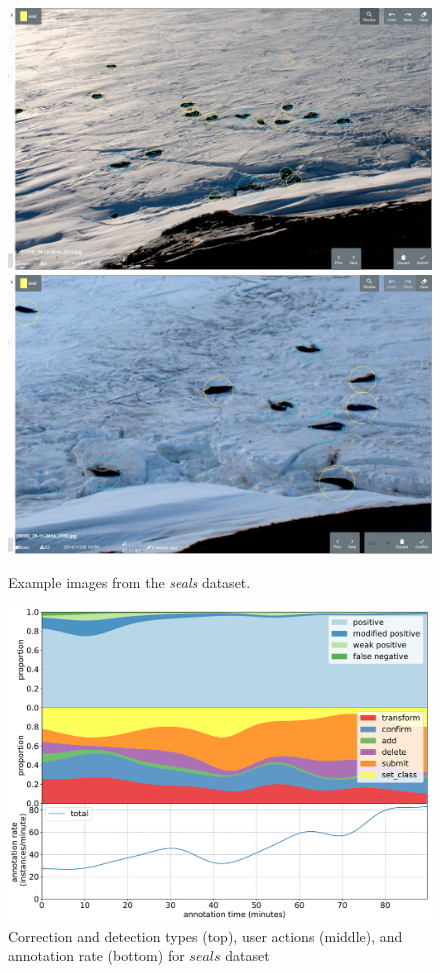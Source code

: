 \begin{figure}[!h]
\centering
  \includegraphics[width=0.475\linewidth]{figures/annotation/screenshots/seals_small2.png}
  \hfill
  \includegraphics[width=0.45\linewidth]{figures/annotation/screenshots/seals_big.png}
  \caption{}
\caption{ Example images from the \emph{seals} dataset.}
\label {fig:seals_examples}
\end{figure}

\begin{figure}[!h]
\centering
\includegraphics[width=1.0\linewidth]{charts/action_annotations/seals1.pdf}
\caption{ Correction and detection types (top), user actions (middle), and annotation rate (bottom) for $seals$ dataset }
\label{fig:seals_annotation}
\end{figure}

\pagebreak
